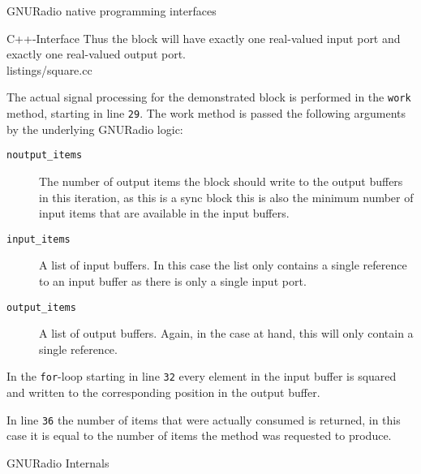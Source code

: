 \begin{subchapter}{GNURadio native programming interfaces}
\begin{subsubchapter}{C++-Interface}
    Thus the block will have exactly one real-valued input port and exactly
    one real-valued output port. \\

    
                    {listings/square.cc}

    The actual signal processing for the demonstrated block
    is performed in the \texttt{work} method, starting in line
    \texttt{29}. The work method is passed the following arguments
    by the underlying GNURadio logic:

    \begin{description}
      \item[\texttt{noutput\_items}]
        The number of output items the block should write to the output
        buffers in this iteration, as this is a sync block this is also
        the minimum number of input items that are available in the input buffers.

      \item[\texttt{input\_items}]
        A list of input buffers. In this case the list only contains
        a single reference to an input buffer as there is only a
        single input port.

      \item[\texttt{output\_items}]
        A list of output buffers. Again, in the case at hand,
        this will only contain a single reference.
    \end{description}
  \end{subsubchapter}

  In the \texttt{for}-loop starting in line \texttt{32}
  every element in the input buffer is squared and written to
  the corresponding position in the output buffer.

  In line \texttt{36} the number of items that were actually consumed
  is returned, in this case it is equal to the number of items
  the method was requested to produce.
\end{subchapter}

\begin{subchapter}{GNURadio Internals}
\end{subchapter}
